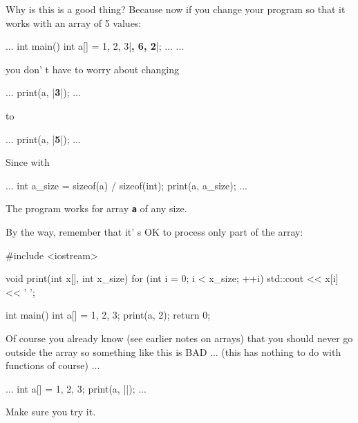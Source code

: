Why is this is a good thing? Because now if you change your program so that it works with an array of 5 values:

\begin{consolethree}[escapeinside=||]
...
int main()
{
    int a[] = {1, 2, 3|\textbf{, 6, 2}|};
    ...
}
...
\end{consolethree}

you don' t have to worry about changing

\begin{consolethree}[escapeinside=||]
...
print(a, |\textbf{3}|);
...
\end{consolethree}

to

\begin{consolethree}[escapeinside=||]
...
print(a, |\textbf{5}|);
...
\end{consolethree}

Since with

\begin{consolethree}[escapeinside=||]
...
int a_size = sizeof(a) / sizeof(int);
print(a, a_size);
...
\end{consolethree}

The program works for array \texttt{\textbf{a}} of any size.

By the way, remember that it' s OK to process only part of the array:

\begin{consolethree}[escapeinside=||]
#include <iostream>

void print(int x[], int x_size)
{
    for (int i = 0; i < x_size; ++i)
    {
        std::cout << x[i] << ' ';
    }
}

int main()
{
    int a[] = {1, 2, 3};
    print(a, 2);
    return 0;
}
\end{consolethree}

Of course you already know (see earlier notes on arrays) that you should never go outside the array so something like this is BAD ... (this has nothing to do with functions of course) ...

\begin{consolethree}[escapeinside=||]
...
int a[] = {1, 2, 3};
print(a, ||);
...
\end{consolethree}

Make sure you try it.

